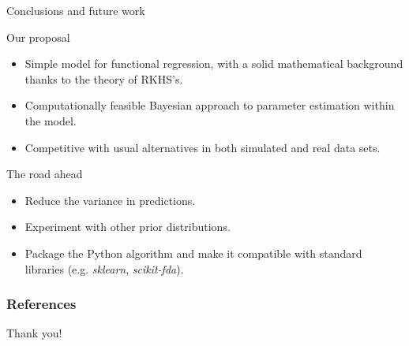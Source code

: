 \documentclass[10pt, english, professionalfonts]{beamer}
\begin{document}
\begin{frame}{Conclusions and future work}

  \begin{alertblock}{Our proposal}
    \begin{itemize}
      \item Simple model for functional regression, with a solid mathematical background thanks to the theory of RKHS's.
      \item Computationally feasible Bayesian approach to parameter estimation within the model.
      \item Competitive with usual alternatives in both simulated and real data sets.
    \end{itemize}
  \end{alertblock}

  \begin{exampleblock}{The road ahead}
    \begin{itemize}
      \item Reduce the variance in predictions.
      \item Experiment with other prior distributions.
      \item Package the Python algorithm and make it compatible with standard libraries (e.g. \textit{sklearn}, \textit{scikit-fda}).
    \end{itemize}
  \end{exampleblock}


\end{frame}

\begin{frame}[allowframebreaks]
    \frametitle{References}
    \nocite{*}
    \printbibliography[heading=none]
\end{frame}

\begin{frame}[standout]
  Thank you!
\end{frame}
\end{document}
